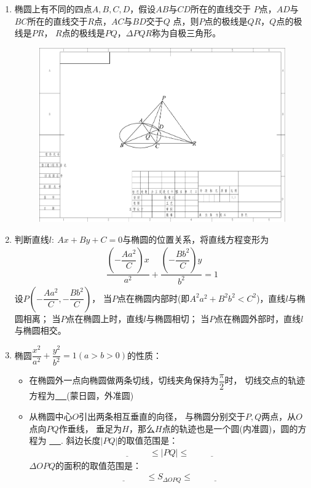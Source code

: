 \documentclass{article}
\newif\ifte
\renewcommand\leq\leqslant
\begin{document}
\begin{multicols}{2}
\begin{enumerate}[leftmargin=20pt]
\item 椭圆上有不同的四点$ A,B,C,D $，假设$ AB $与$ CD $所在的直线交于
$ P $点，$ AD $与$ BC $所在的直线交于$ R $点，$ AC $与$ BD $交于$ Q $
点，则$ P $点的极线是$ QR $，$ Q $点的极线是$ PR $，
$ R $点的极线是$ PQ $，$ \Delta PQR $称为自极三角形。
\begin{figure}[H]
    \centering
    \includegraphics[width=0.6\linewidth]{自极三角形}
\end{figure}

\item 判断直线$ l:\ Ax+By+C=0 $与椭圆的位置关系，将直线方程变形为
\begin{gather*}
    \dfrac{\left(-\dfrac{Aa^2}{C}\right)x}{a^2}+
    \dfrac{\left(-\dfrac{Bb^2}{C}\right)y}{b^2}=1
\end{gather*}
设$ P\left(-\dfrac{Aa^2}{C},-\dfrac{Bb^2}{C}\right) $，
当$ P $点在椭圆内部时(即$ A^2a^2+B^2b^2<C^2 $)，直线$ l $与椭圆相离；
当$ P $点在椭圆上时，直线$ l $与椭圆相切；
当$ P $点在椭圆外部时，直线$ l $与椭圆相交。

\item 椭圆$ \dfrac{x^2}{a^2}+\dfrac{y^2}{b^2}=1 (a>b>0) $的性质：
\begin{itemize}[leftmargin=-4pt]
\item 在椭圆外一点向椭圆做两条切线，切线夹角保持为$ \dfrac{\pi}{2} $时，
切线交点的轨迹方程为\underline{\ \ifte $ x_0^2+y_0^2=a^2+b^2 $
    \else \hspace{3cm} \fi\ }(蒙日圆，外准圆)

\item 从椭圆中心$ O $引出两条相互垂直的向径，
与椭圆分别交于$ P,Q $两点，从$ O $点向$ PQ $作垂线，
垂足为$ H $，那么$ H $点的轨迹也是一个圆(内准圆)，圆的方程为
\underline{\ \ifte $ x^2+y^2=\dfrac{a^2b^2}{a^2+b^2} $
    \else \hspace{3cm} \fi\ }.
斜边长度$ |PQ| $的取值范围是：
\begin{gather*}
    \underline{\ \ifte \dfrac{2ab}{\sqrt{a^2+b^2}} \else \hspace{2cm} \fi\ }
    \leq |PQ| \leq 
    \underline{\ \ifte \sqrt{a^2+b^2} \else \hspace{2cm} \fi\ }
\end{gather*}
$ \Delta OPQ $的面积的取值范围是：
\begin{gather*}
    \underline{\ \ifte \dfrac{a^2b^2}{a^2+b^2}\else \hspace{2cm} \fi\ }
    \leq S_{\Delta OPQ} \leq 
    \underline{\ \ifte \dfrac{1}{2}ab \else \hspace{2cm} \fi\ }
\end{gather*}


\end{itemize}
\end{enumerate}
\end{multicols}
\end{document}
